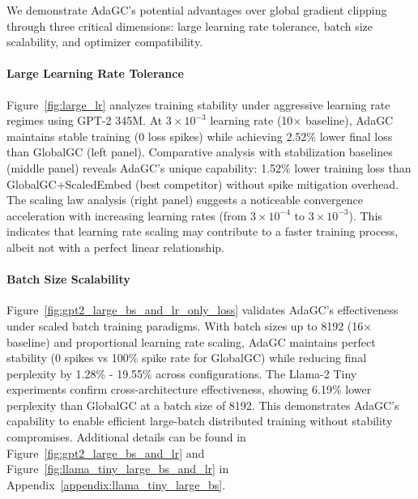 We demonstrate AdaGC's potential advantages over global gradient clipping through three critical dimensions: large learning rate tolerance, batch size scalability, and optimizer compatibility.

\paragraph{Large Learning Rate Tolerance} 
Figure~\ref{fig:large_lr} analyzes training stability under aggressive learning rate regimes using GPT-2 345M. At \(3 \times 10^{-3}\) learning rate (10$\times$ baseline), AdaGC maintains stable training (0 loss spikes) while achieving 2.52\% lower final loss than GlobalGC (left panel). Comparative analysis with stabilization baselines (middle panel) reveals AdaGC's unique capability: 1.52\% lower training loss than GlobalGC+ScaledEmbed (best competitor) without spike mitigation overhead. The scaling law analysis (right panel) suggests a noticeable convergence acceleration with increasing learning rates (from \(3 \times 10^{-4}\) to \(3 \times 10^{-3}\)). This indicates that learning rate scaling may contribute to a faster training process, albeit not with a perfect linear relationship.

\paragraph{Batch Size Scalability}
Figure~\ref{fig:gpt2_large_bs_and_lr_only_loss} validates AdaGC's effectiveness under scaled batch training paradigms. With batch sizes up to 8192 (16$\times$ baseline) and proportional learning rate scaling, AdaGC maintains perfect stability (0 spikes vs 100\% spike rate for GlobalGC) while reducing final perplexity by 1.28\% - 19.55\% across configurations. The Llama-2 Tiny experiments confirm cross-architecture effectiveness, showing 6.19\% lower perplexity than GlobalGC at a batch size of 8192. This demonstrates AdaGC's capability to enable efficient large-batch distributed training without stability compromises. Additional details can be found in Figure~\ref{fig:gpt2_large_bs_and_lr} and Figure~\ref{fig:llama_tiny_large_bs_and_lr} in Appendix~\ref{appendix:llama_tiny_large_bs}.



